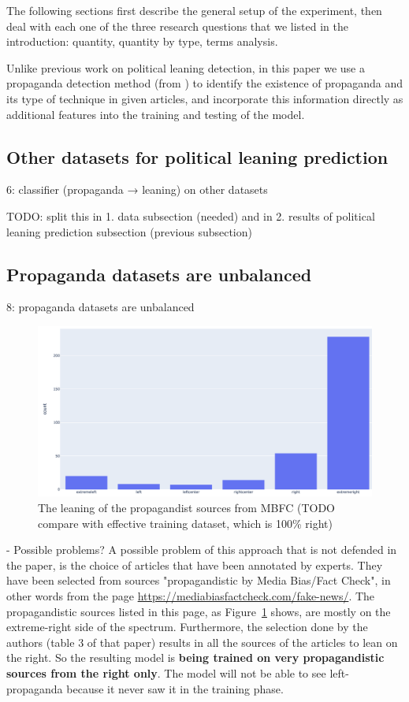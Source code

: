 The following sections first describe the general setup of the experiment, then deal with each one of the three research questions that we listed in the introduction: quantity, quantity by type, terms analysis.%


Unlike previous work on political leaning detection, in this paper we use a propaganda detection method (from \citet{da2019fine}) to identify the existence of propaganda and its type of technique in given articles, and incorporate this information directly as additional features into the training and testing of the model.  


\subsection{Other datasets for political leaning prediction}
6: classifier (propaganda → leaning) on other datasets

TODO: split this in 
1. data subsection (needed) and in
2. results of political leaning prediction subsection (previous subsection)

\subsection{Propaganda datasets are unbalanced}

8: propaganda datasets are unbalanced

\begin{figure}[!htb]
   \centering
   \includegraphics[width=\linewidth]{figures/leaning_questionable.png}
   \caption{The leaning of the propagandist sources from MBFC (TODO compare with effective training dataset, which is 100\% right)}
   \label{fig:mbfc_leaning}
\end{figure}

- Possible problems?
A possible problem of this approach that is not defended in the paper, is the choice of articles that have been annotated by experts. They have been selected from sources "propagandistic by Media Bias/Fact Check", in other words from the page \url{https://mediabiasfactcheck.com/fake-news/}. The propagandistic sources listed in this page, as Figure~\ref{fig:mbfc_leaning} shows, are mostly on the extreme-right side of the spectrum. Furthermore, the selection done by the authors (table 3 of that paper) results in all the sources of the articles to lean on the right.
So the resulting model is \textbf{being trained on very propagandistic sources from the right only}. The model will not be able to see left-propaganda because it never saw it in the training phase.

